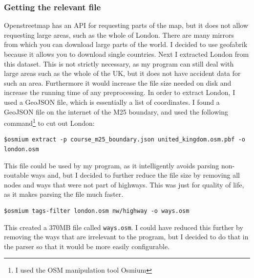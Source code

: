 \documentclass[11pt,twoside,a4paper]{report}
\begin{document}
\subsubsection{Getting the relevant file}
Openstreetmap has an API for requesting parts of the map, but it does not allow requesting large areas, such as the whole of London. There are many mirrors from which you can download large parts of the world. I decided to use geofabrik \cite{geofabrik}
 because it allows you to download single countries. Next I extracted London from this dataset. This is not strictly necessary, as my program can still deal with large areas such as the whole of the UK, but it does not have accident data for such an area.
 Furthermore it would increase the file size needed on disk and increase the running time of any preprocessing. In order to extract London, I used a GeoJSON\cite{geojsondefinition} file, which is essentially a list of coordinates. I found a GeoJSON file on the internet \cite{geojsonsource}
 of the M25 boundary, and used the following command\footnote{I used the OSM manipulation tool Osmium} to cut out London: 
 \begin{verbatim}
$osmium extract -p course_m25_boundary.json united_kingdom.osm.pbf -o london.osm
 \end{verbatim}
 This file could be used by my program, as it intelligently avoids parsing non-routable ways and, but I decided to further reduce the file size by removing all nodes and ways that were not part of highways.
 This was just for quality of life, as it makes parsing the file much faster.
 \begin{verbatim}
$osmium tags-filter london.osm nw/highway -o ways.osm
 \end{verbatim}
 This created a 370MB file called \texttt{ways.osm}. I could have reduced this further by removing the ways that are irrelevant to the program, but I decided to do that in the parser so that it would be
 more easily configurable.
\end{document}

